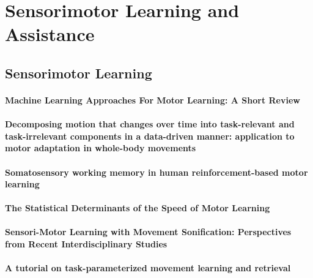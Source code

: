 \documentclass[11pt]{article}
\begin{document}
\section{Sensorimotor Learning and Assistance}

\subsection{Sensorimotor Learning}
\paragraph{Machine Learning Approaches For Motor Learning: A Short Review} \citep{caramiaux_machine_2020}

\paragraph{Decomposing motion that changes over time into task-relevant and task-irrelevant components in a data-driven manner: application to motor adaptation in whole-body movements} \citep{furuki_decomposing_2019}

\paragraph{Somatosensory working memory in human reinforcement-based motor learning} \citep{sidarta_somatosensory_2018}

\paragraph{The Statistical Determinants of the Speed of Motor Learning} \citep{he_statistical_2016}

\paragraph{Sensori-Motor Learning with Movement Sonification: Perspectives from Recent Interdisciplinary Studies} \citep{bevilacqua_sensori-motor_2016}

\paragraph{A tutorial on task-parameterized movement learning and retrieval} \citep{calinon_tutorial_2016}
\end{document}
